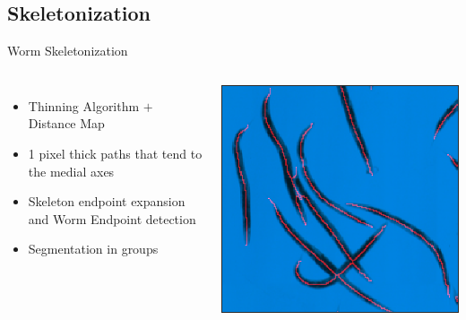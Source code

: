 \documentclass{beamer}
\begin{document}
\subsection{Skeletonization}
\begin{frame}{Worm Skeletonization}

\begin{columns}[c]
\column{2.4in}
\begin{itemize}
\item Thinning Algorithm $+$ Distance Map \pause
\item 1 pixel thick paths that tend to the medial axes \pause
\item Skeleton endpoint expansion and Worm Endpoint detection \pause
\item Segmentation in groups
\end{itemize}
\column{2in}
\includegraphics[scale=0.3]{skeleton1}

\end{columns}

\end{frame}


\end{document}
